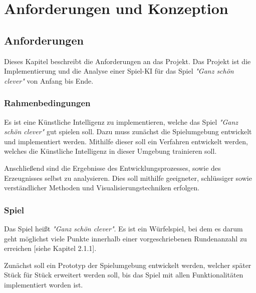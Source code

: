 \section{Anforderungen und Konzeption}
\subsection{Anforderungen}
Dieses Kapitel beschreibt die Anforderungen an das Projekt. Das Projekt ist die Implementierung und die Analyse einer Spiel-KI für das Spiel \textit{"Ganz schön clever"} von Anfang bis Ende.
\subsubsection{Rahmenbedingungen}
Es ist eine Künstliche Intelligenz zu implementieren, welche das Spiel \textit{"Ganz schön clever"} gut spielen soll. Dazu muss zunächst die Spielumgebung entwickelt und implementiert werden. Mithilfe dieser soll ein Verfahren entwickelt werden, welches die Künstliche Intelligenz in dieser Umgebung trainieren soll.

Anschließend sind die Ergebnisse des Entwicklungsprozesses, sowie des Erzeugnisses selbst zu analysieren. Dies soll mithilfe geeigneter, schlüssiger sowie verständlicher Methoden und Visualisierungstechniken erfolgen.
\subsubsection{Spiel}
Das Spiel heißt \textit{"Ganz schön clever"}. Es ist ein Würfelspiel, bei dem es darum geht möglichst viele Punkte innerhalb einer vorgeschriebenen Rundenanzahl zu erreichen [siehe Kapitel 2.1.1].

Zunächst soll ein Prototyp der Spielumgebung entwickelt werden, welcher später Stück für Stück erweitert werden soll, bis das Spiel mit allen Funktionalitäten implementiert worden ist.\\

